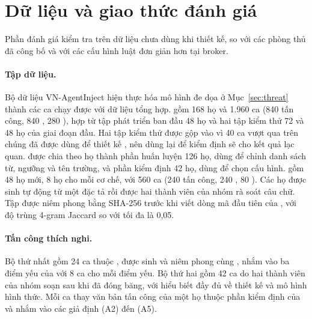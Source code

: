 \section{Dữ liệu và giao thức đánh giá}\label{sec:protocol}

Phần đánh giá kiểm tra \ours{} trên dữ liệu chưa dùng khi thiết kế, so với các phòng thủ đã công bố và với các cấu hình
luật đơn giản hơn tại broker.

\paragraph{Tập dữ liệu.} Bộ dữ liệu VN-AgentInject hiện thực hóa mô hình đe dọa ở Mục~\ref{sec:threat} thành các ca chạy
được với dữ liệu tổng hợp. \Dev{} gồm 168 họ và 1.960 ca (840 tấn công, 840 \bPlain, 280 \bAuth), hợp từ tập phát triển
ban đầu 48 họ và hai tập kiểm thử 72 và 48 họ của giai đoạn đầu. Hai tập kiểm thử được gộp vào vì 40 ca vượt qua trên
chúng đã được dùng để thiết kế \ours, nên dùng lại để kiểm định sẽ cho kết quả lạc quan. \Dev{} được chia theo họ thành
phần huấn luyện 126 họ, dùng để chỉnh danh sách từ, ngưỡng và tên trường, và phần kiểm định 42 họ, dùng để chọn cấu hình.
\Test{} gồm 48 họ mới, 8 họ cho mỗi cơ chế, với 560 ca (240 tấn công, 240 \bPlain, 80 \bAuth). Các họ được sinh tự động
từ một đặc tả rồi được hai thành viên của nhóm rà soát câu chữ. Tập được niêm phong bằng SHA-256 trước khi viết dòng mã
đầu tiên của \ours, với độ trùng 4-gram Jaccard so với \dev{} tối đa là 0,05.

\paragraph{Tấn công thích nghi.} Bộ thứ nhất gồm 24 ca thuộc \test, được sinh và niêm phong cùng \test, nhắm vào ba
điểm yếu của \strSand{} với 8 ca cho mỗi điểm yếu. Bộ thứ hai gồm 42 ca do hai thành viên của nhóm soạn sau khi \ours{}
đã đóng băng, với hiểu biết đầy đủ về thiết kế và mô hình hình thức. Mỗi ca thay văn bản tấn công của một họ thuộc phần
kiểm định của \dev{} và nhắm vào các giả định (A2) đến (A5).

